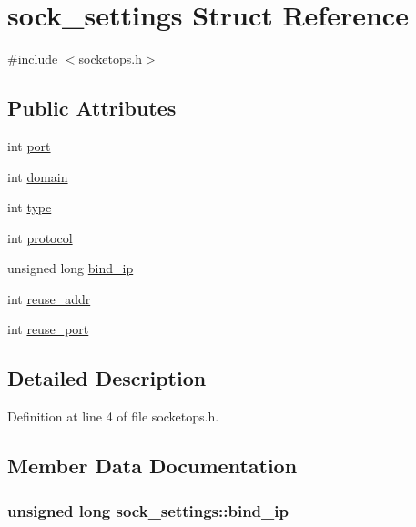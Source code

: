 \hypertarget{structsock__settings}{\section{sock\-\_\-settings Struct Reference}
\label{structsock__settings}
}


{\ttfamily \#include $<$socketops.\-h$>$}

\subsection*{Public Attributes}
\begin{DoxyCompactItemize}
\item 
int \hyperlink{structsock__settings_aef86a0ad1b9e93d1a5b5c0c27f9336f8}{port}
\item 
int \hyperlink{structsock__settings_a95727084b18e3c1923a219e15260d79b}{domain}
\item 
int \hyperlink{structsock__settings_afbd04165a11524a3a0ff83702958398f}{type}
\item 
int \hyperlink{structsock__settings_a938f8fc4b2ec0de16c809d4cc1d301da}{protocol}
\item 
unsigned long \hyperlink{structsock__settings_a894feefad3edf96c08f07b4497a8f1d0}{bind\-\_\-ip}
\item 
int \hyperlink{structsock__settings_a912e4c6ee79af4d8d259b7c85239a7f7}{reuse\-\_\-addr}
\item 
int \hyperlink{structsock__settings_a9c727193200daa5ef25f9a74e983de1f}{reuse\-\_\-port}
\end{DoxyCompactItemize}


\subsection{Detailed Description}


Definition at line 4 of file socketops.\-h.



\subsection{Member Data Documentation}
\hypertarget{structsock__settings_a894feefad3edf96c08f07b4497a8f1d0}{
\subsubsection[{bind\-\_\-ip}]{\setlength{\rightskip}{0pt plus 5cm}unsigned long sock\-\_\-settings\-::bind\-\_\-ip}}\label{structsock__settings_a894feefad3edf96c08f07b4497a8f1d0}



